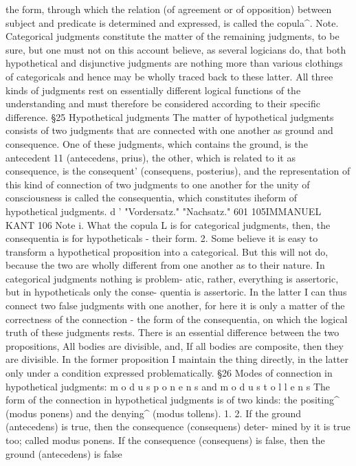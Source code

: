 the form, through which the relation (of agreement or of opposition)
between subject and predicate is determined and expressed, is called the
copula^.
Note.
Categorical judgments constitute the matter of the remaining judgments,
to be sure, but one must not on this account believe, as several logicians
do, that both hypothetical and disjunctive judgments are nothing more
than various clothings of categoricals and hence may be wholly traced back
to these latter. All three kinds of judgments rest on essentially different
logical functions of the understanding and must therefore be considered
according to their specific difference.
§25
Hypothetical judgments
The matter of hypothetical judgments consists of two judgments that are
connected with one another as ground and consequence. One of these
judgments, which contains the ground, is the antecedent 11 (antecedens, prius),
the other, which is related to it as consequence, is the consequent'
(consequens, posterius), and the representation of this kind of connection of
two judgments to one another for the unity of consciousness is called the
consequentia, which constitutes iheform of hypothetical judgments.
d
'
"Vordersatz."
"Nachsatz."
601
105IMMANUEL KANT
106
Note i. What the copula L is for categorical judgments, then, the consequentia is for
hypotheticals - their form.
2. Some believe it is easy to transform a hypothetical proposition into a
categorical. But this will not do, because the two are wholly different from
one another as to their nature. In categorical judgments nothing is problem-
atic, rather, everything is assertoric, but in hypotheticals only the conse-
quentia is assertoric. In the latter I can thus connect two false judgments
with one another, for here it is only a matter of the correctness of the
connection - the form of the consequentia, on which the logical truth of
these judgments rests. There is an essential difference between the two
propositions, All bodies are divisible, and, If all bodies are composite, then
they are divisible. In the former proposition I maintain the thing directly, in
the latter only under a condition expressed problematically.
§26
Modes of connection in hypothetical judgments: m o d u s p o n e n s
and m o d u s t o l l e n s
The form of the connection in hypothetical judgments is of two kinds: the
positing^ (modus ponens) and the denying^ (modus tollens).
1.
2.
If the ground (antecedens) is true, then the consequence (consequens) deter-
mined by it is true too; called modus ponens.
If the consequence (consequens) is false, then the ground (antecedens) is false
